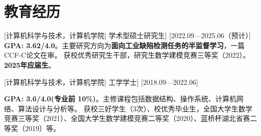 \documentclass{resume}
\begin{document}


\ResumeTitle


\section{教育经历}
[\textnormal{计算机科学与技术，计算机学院|}  学术型硕士研究生]
[2022.09—2025.06（预计）]
\textbf{GPA: 3.62/4.0}。主要研究方向为\textbf{面向工业缺陷检测任务的半监督学习}，一篇CCF-C论文在审。\newline
获校优秀研究生干部，研究生数学建模竞赛三等奖（2022）。\textbf{2025年应届生}。

[\textnormal{计算机科学与技术，计算机学院|} 工学学士]
[2018.09—2022.06]

\textbf{GPA: 3.6/4.0(专业前 10\%)}。主修课程包括数据结构、操作系统、计算机网络、算法设计与分析等。\newline
获校三好学生（3次）、校优秀毕业生，全国大学生数学竞赛三等奖（2021）、全国大学生数学建模竞赛二等奖（2020）、蓝桥杯湖北省赛二等奖（2019）等。
\end{document}
